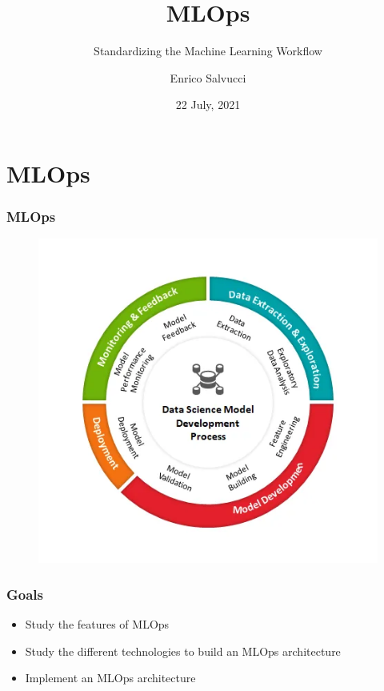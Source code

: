 \documentclass{beamer}
\title[University of Bologna]{MLOps}
\subtitle{Standardizing the Machine Learning Workflow}
\author{Enrico Salvucci}
\date[22 July, 2021]{22 July, 2021}
\begin{document}
\frame{\titlepage}




\section{MLOps}

\begin{frame}
\frametitle{MLOps}

\begin{figure}
\includegraphics[scale=0.45]{figure/data-science-lifecycle.png}
\end{figure}

\end{frame}

\begin{frame}
\frametitle{Goals}
    \begin{itemize}
        \item Study the features of MLOps
        \item Study the different technologies to build an MLOps architecture
        \item Implement an MLOps architecture %
    \end{itemize}
\end{frame}
\end{document}
